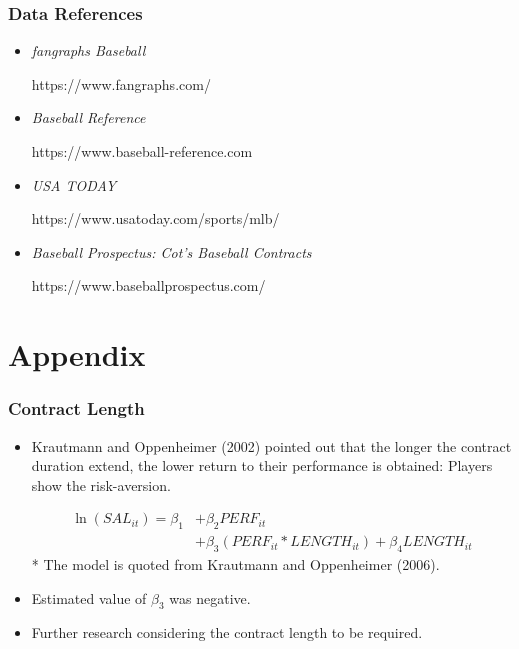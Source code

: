 \documentclass[dvipdfmx,12pt]{beamer}
\begin{document}
\begin{frame}\frametitle{Data References}
  \begin{itemize}
    \item \textit{fangraphs Baseball}

    https://www.fangraphs.com/

    \item \textit{Baseball Reference}

    https://www.baseball-reference.com

    \item \textit{USA TODAY}

    https://www.usatoday.com/sports/mlb/

    \item \textit{Baseball Prospectus: Cot's Baseball Contracts}

    https://www.baseballprospectus.com/
  \end{itemize}
\end{frame}

\section*{Appendix}
\begin{frame}\frametitle{Contract Length}
  \begin{itemize}
    \item Krautmann and Oppenheimer (2002) pointed out that the longer the contract duration extend, the lower return to their performance is obtained: Players show the risk-aversion.

    \begin{align*}
      \ln(SAL_{it}) = \beta_1 &+ \beta_2 PERF_{it} \\
      &+ \beta_3 (PERF_{it} * LENGTH_{it})+ \beta_4 LENGTH_{it}
    \end{align*}
    \footnotesize
    \flushright
    * The model is quoted from Krautmann and Oppenheimer (2006).

    \flushleft
    \normalsize

    \item Estimated value of $\beta_3$ was negative.

    \item Further research considering the contract length to be required.
  \end{itemize}

\end{frame}
\end{document}
